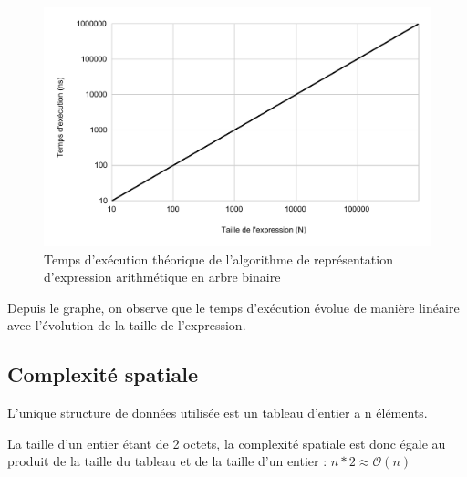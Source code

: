 \begin{figure}[H]
    \centering
        \includegraphics[scale=0.5]{./ressources/temps_execution_th_algo2.pdf}
        \caption{Temps d'exécution théorique de l'algorithme de représentation d'expression arithmétique en arbre binaire}
    \label{fig:temps_exec_th_algo2}
\end{figure} 

Depuis le graphe,  on observe que le temps d'exécution évolue de manière linéaire avec l'évolution de la taille de l'expression.


\subsection{Complexité spatiale}
\par
L'unique structure de données utilisée est un tableau d'entier a n éléments. 
\par
La taille d'un entier étant de 2 octets, la complexité spatiale est donc égale au produit de la taille du tableau et de la taille d'un entier : $n * 2 \approx \mathcal{O}(n)$
\par

